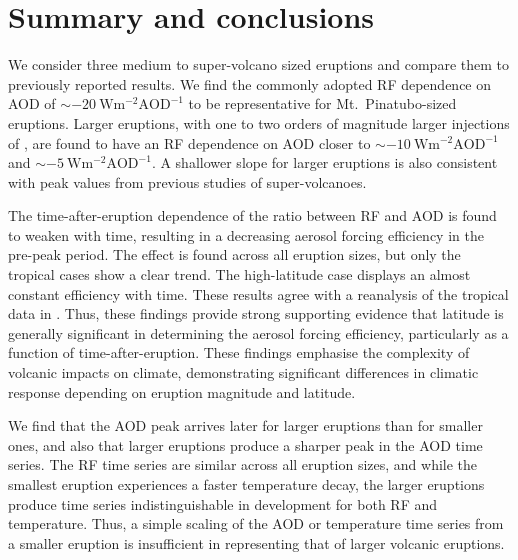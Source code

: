 \documentclass[draft]{agujournal2019}
\begin{document}
\section{Summary and conclusions}\label{sec:conclusions}

We consider three medium to super-volcano sized eruptions and compare them to previously
reported results. We find the commonly adopted RF dependence on AOD of
\(\sim\SI{-20}{\watt\metre^{-2}\mathrm{AOD}^{-1}}\) to be representative for Mt.\
Pinatubo-sized eruptions. Larger eruptions, with one to two orders of magnitude larger
injections of \ce{SO2}, are found to have an RF dependence on AOD closer to
\(\sim\SI{-10}{\watt\metre^{-2}\mathrm{AOD}^{-1}}\) and
\(\sim\SI{-5}{\watt\metre^{-2}\mathrm{AOD}^{-1}}\). A shallower slope for larger
eruptions is also consistent with peak values from previous studies of super-volcanoes.

The time-after-eruption dependence of the ratio between RF and AOD is found to weaken
with time, resulting in a decreasing aerosol forcing efficiency in the pre-peak period.
The effect is found across all eruption sizes, but only the tropical cases show a clear
trend. The high-latitude case displays an almost constant efficiency with time. These
results agree with a reanalysis of the tropical data in \citeA{marshall2020dataset}.
Thus, these findings provide strong supporting evidence that latitude is generally
significant in determining the aerosol forcing efficiency, particularly as a function of
time-after-eruption. These findings emphasise the complexity of volcanic impacts on
climate, demonstrating significant differences in climatic response depending on
eruption magnitude and latitude.

We find that the AOD peak arrives later for larger eruptions than for smaller ones, and
also that larger eruptions produce a sharper peak in the AOD time series. The RF time
series are similar across all eruption sizes, and while the smallest eruption
experiences a faster temperature decay, the larger eruptions produce time series
indistinguishable in development for both RF and temperature. Thus, a simple scaling of
the AOD or temperature time series from a smaller eruption is insufficient in
representing that of larger volcanic eruptions.
\end{document}
